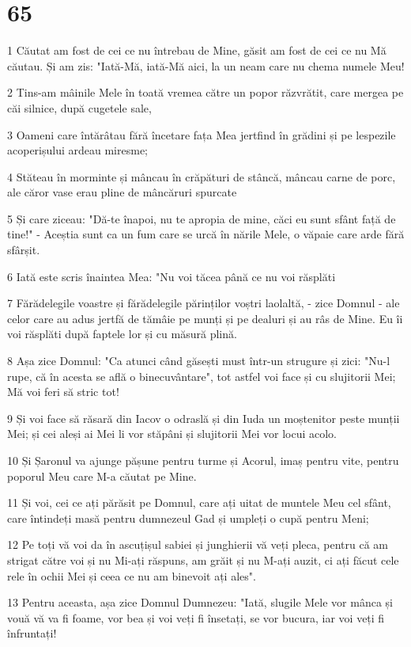\chapter{65}

\par 1 Căutat am fost de cei ce nu întrebau de Mine, găsit am fost de cei ce nu Mă căutau. Și am zis: "Iată-Mă, iată-Mă aici, la un neam care nu chema numele Meu!
\par 2 Tins-am mâinile Mele în toată vremea către un popor răzvrătit, care mergea pe căi silnice, după cugetele sale,
\par 3 Oameni care întărâtau fără încetare fața Mea jertfind în grădini și pe lespezile acoperișului ardeau miresme;
\par 4 Stăteau în morminte și mâncau în crăpături de stâncă, mâncau carne de porc, ale căror vase erau pline de mâncăruri spurcate
\par 5 Și care ziceau: "Dă-te înapoi, nu te apropia de mine, căci eu sunt sfânt față de tine!" - Aceștia sunt ca un fum care se urcă în nările Mele, o văpaie care arde fără sfârșit.
\par 6 Iată este scris înaintea Mea: "Nu voi tăcea până ce nu voi răsplăti
\par 7 Fărădelegile voastre și fărădelegile părinților voștri laolaltă, - zice Domnul - ale celor care au adus jertfă de tămâie pe munți și pe dealuri și au râs de Mine. Eu îi voi răsplăti după faptele lor și cu măsură plină.
\par 8 Așa zice Domnul: "Ca atunci când găsești must într-un strugure și zici: "Nu-l rupe, că în acesta se află o binecuvântare", tot astfel voi face și cu slujitorii Mei; Mă voi feri să stric tot!
\par 9 Și voi face să răsară din Iacov o odraslă și din Iuda un moștenitor peste munții Mei; și cei aleși ai Mei li vor stăpâni și slujitorii Mei vor locui acolo.
\par 10 Și Șaronul va ajunge pășune pentru turme și Acorul, imaș pentru vite, pentru poporul Meu care M-a căutat pe Mine.
\par 11 Și voi, cei ce ați părăsit pe Domnul, care ați uitat de muntele Meu cel sfânt, care întindeți masă pentru dumnezeul Gad și umpleți o cupă pentru Meni;
\par 12 Pe toți vă voi da în ascuțișul sabiei și junghierii vă veți pleca, pentru că am strigat către voi și nu Mi-ați răspuns, am grăit și nu M-ați auzit, ci ați făcut cele rele în ochii Mei și ceea ce nu am binevoit ați ales".
\par 13 Pentru aceasta, așa zice Domnul Dumnezeu: "Iată, slugile Mele vor mânca și vouă vă va fi foame, vor bea și voi veți fi însetați, se vor bucura, iar voi veți fi înfruntați!
